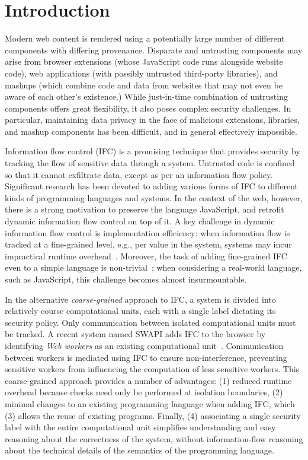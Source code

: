 \section{Introduction}
\label{sec:intro}

Modern web content is rendered using a potentially large number of
different components with differing provenance.
Disparate and untrusting components may arise from browser
extensions (whose JavaScript code runs alongside website
code), web applications (with possibly untrusted third-party
libraries), and mashups (which combine code and data from
websites that may not even be aware of each other's existence.)
While just-in-time combination of untrusting components
offers great flexibility, it also poses complex security challenges.
In particular, maintaining data privacy in the face of malicious
extensions, libraries, and mashup components has been difficult,
and in general effectively impossible.

Information flow control (IFC) is a promising technique
that provides security
by tracking the flow of sensitive data through a system.
Untrusted code is confined so that it cannot exfiltrate data, except as
per an information flow policy.  Significant research has been devoted to
adding various forms of IFC to different kinds of programming languages
and systems.  In the context of the web, however, there is a strong
motivation to preserve the language JavaScript, and retrofit dynamic information
flow control on top of it.  A key challenge in dynamic information
flow control is implementation efficiency: when
information flow is tracked at a fine-grained level,
e.g., per value in the system, systems may incur
impractical runtime overhead~\cite{JSFlow}.
%
Moreover, the task of adding fine-grained IFC even to a simple language is
non-trivial~\cite{hritcu2013testing}; when considering a real-world language,
such as JavaScript, this challenge becomes almost insurmountable.


In the alternative \textit{coarse-grained} approach to IFC,
a system is divided into relatively course computational units,
each with a single label dictating its security policy.
Only
communication between isolated computational units must be tracked.
A recent system named SWAPI adds IFC to the
browser by identifying \emph{Web workers} as an existing computational
unit~\cite{swapi}.  Communication between workers is mediated using
IFC to ensure non-interference, preventing sensitive workers from
influencing the computation of less sensitive workers.
This coarse-grained approach provides a number of advantages:
(1) reduced runtime overhead because checks need only
be performed at isolation boundaries, (2) minimal changes to an
existing programming language when adding IFC, which (3) allows
the reuse of existing programs.  Finally, (4) associating
a single security label with the entire computational unit simplifies
understanding and easy reasoning about the correctness of the
system, without information-flow reasoning about the
technical details of the semantics of the programming language.

